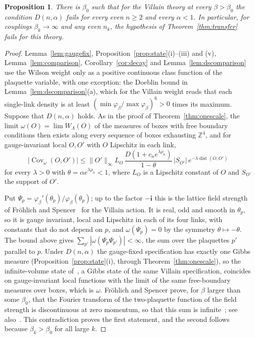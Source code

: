 \documentclass[aps,prd,twocolumn,superscriptaddress,nofootinbib,longbibliography,floatfix,amsmath,amssymb,10pt]{revtex4-2}
\newtheorem{proposition}[theorem]{Proposition}
\theoremstyle{definition}
\theoremstyle{remark}
\newcommand{\Z}{\mathbb{Z}}
\newcommand{\Cov}{\operatorname{Cov}}
\newcommand{\dist}{\operatorname{dist}}
\begin{document}
\begin{proposition}\label{prop:coulomb}
There is $\beta_0$ such that for the Villain theory at every $\beta>\beta_0$
the condition $D(n,\alpha)$ fails for every even $n\ge2$ and every
$\alpha<1$. In particular, for couplings $\beta_k\to\infty$ and any even
$n_k$, the hypothesis of Theorem~\ref{thm:transfer} fails for this theory.
\end{proposition}

\begin{proof}
Lemma~\ref{lem:gaugefix}, Proposition~\ref{prop:state}(i)--(iii) and (v),
Lemma~\ref{lem:comparison}, Corollary~\ref{cor:decay} and
Lemma~\ref{lem:dscomparison} use the Wilson weight only as a positive
continuous class function of the plaquette variable, with one exception:
the Doeblin bound in Lemma~\ref{lem:dscomparison}(a), which for the Villain
weight reads that each single-link density is at least
$(\min\varphi_\beta/\max\varphi_\beta)^6>0$ times its maximum. Suppose that
$D(n,\alpha)$ holds. As in the proof of Theorem~\ref{thm:onescale}, the limit
$\omega(O)=\lim W_\Lambda(O)$ of the measures of boxes with free boundary
conditions then exists along every sequence of boxes exhausting $\Z^4$, and
for gauge-invariant local $O,O'$ with $O$ Lipschitz in each link,
\[
|\Cov_\omega(O,O')|\le\|O'\|_\infty L_O\,
\frac{D(1+c_ne^{\lambda\rho_n})}{1-\theta}\,|S_{O'}|\,
e^{-\lambda\dist(O,O')}
\]
for every $\lambda>0$ with $\theta=\alpha e^{\lambda\rho_n}<1$, where $L_O$
is a Lipschitz constant of $O$ and $S_{O'}$ the support of $O'$.

Put $\Psi_p=\varphi_\beta'(\theta_p)/\varphi_\beta(\theta_p)$; up to the factor
$-\mathbf i$ this is the lattice field strength of Fr\"ohlich and
Spencer~\cite[Sect.~2]{FS82} for the Villain action. It is real, odd and
smooth in $\theta_p$, so it is gauge invariant, local and Lipschitz in each
of its four links, with constants that do not depend on $p$, and
$\omega(\Psi_p)=0$ by the symmetry $\theta\mapsto-\theta$. The bound above
gives $\sum_{p'}|\omega(\Psi_p\Psi_{p'})|<\infty$, the sum over the
plaquettes $p'$ parallel to $p$. Under $D(n,\alpha)$ the gauge-fixed specification has exactly one Gibbs measure (Proposition~\ref{prop:state}(i), through Theorem~\ref{thm:onescale}), so the infinite-volume state of~\cite{FS82}, a Gibbs state of the same Villain specification, coincides on gauge-invariant local functions with the limit of
the same free-boundary measures over boxes, which is $\omega$. Fr\"ohlich
and Spencer prove, for $\beta$ larger than some $\beta_0$, that the Fourier
transform of the two-plaquette function of the field strength is
discontinuous at zero momentum, so that this sum is
infinite~\cite[Sect.~2]{FS82}; see also~\cite{Gut80}. This contradiction
proves the first statement, and the second follows because $\beta_k>\beta_0$
for all large $k$.
\end{proof}
\end{document}
